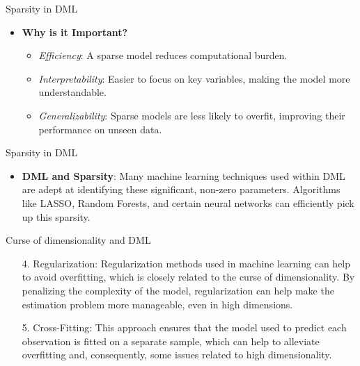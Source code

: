 \documentclass{beamer}
\begin{document}
\begin{frame}{Sparsity in DML}

\begin{itemize}

\item \textbf{Why is it Important?}
\begin{itemize}
\item \textit{Efficiency}: A sparse model reduces computational burden.
\item \textit{Interpretability}: Easier to focus on key variables, making the model more understandable.
\item \textit{Generalizability}: Sparse models are less likely to overfit, improving their performance on unseen data.
\end{itemize}

\end{itemize}

\end{frame}


\begin{frame}{Sparsity in DML}

\begin{itemize}

\item \textbf{DML and Sparsity}: Many machine learning techniques used within DML are adept at identifying these significant, non-zero parameters. Algorithms like LASSO, Random Forests, and certain neural networks can efficiently pick up this sparsity.
\end{itemize}

\end{frame}





\begin{frame}{Curse of dimensionality and DML}


\begin{enumerate}


\item[4. ] Regularization: Regularization methods used in machine learning can help to avoid overfitting, which is closely related to the curse of dimensionality. By penalizing the complexity of the model, regularization can help make the estimation problem more manageable, even in high dimensions.

\item[5. ]Cross-Fitting: This approach ensures that the model used to predict each observation is fitted on a separate sample, which can help to alleviate overfitting and, consequently, some issues related to high dimensionality.


\end{enumerate}

\end{frame}
\end{document}
